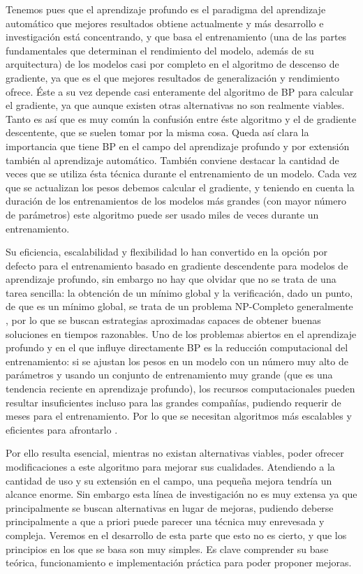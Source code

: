 Tenemos pues que el aprendizaje profundo es el paradigma del aprendizaje automático que mejores resultados obtiene actualmente y más desarrollo e investigación está concentrando, y que basa el entrenamiento (una de las partes fundamentales que determinan el rendimiento del modelo, además de su arquitectura) de los modelos casi por completo en el algoritmo de descenso de gradiente, ya que es el que mejores resultados de generalización y rendimiento ofrece. Éste a su vez depende casi enteramente del algoritmo de BP para calcular el gradiente, ya que aunque existen otras alternativas no son realmente viables. Tanto es así que es muy común la confusión entre éste algoritmo y el de gradiente descentente, que se suelen tomar por la misma cosa. Queda así clara la importancia que tiene BP en el campo del aprendizaje profundo y por extensión también al aprendizaje automático. También conviene destacar la cantidad de veces que se utiliza ésta técnica durante el entrenamiento de un modelo. Cada vez que se actualizan los pesos debemos calcular el gradiente, y teniendo en cuenta la duración de los entrenamientos de los modelos más grandes (con mayor número de parámetros) este algoritmo puede ser usado miles de veces durante un entrenamiento.

Su eficiencia, escalabilidad y flexibilidad lo han convertido en la opción por defecto para el entrenamiento basado en gradiente descendente para modelos de aprendizaje profundo, sin embargo no hay que olvidar que no se trata de una tarea sencilla: la obtención de un mínimo global y la verificación, dado un punto, de que es un mínimo global, se trata de un problema NP-Completo generalmente \cite{NPHardProblem}, por lo que se buscan estrategias aproximadas capaces de obtener buenas soluciones en tiempos razonables. Uno de los problemas abiertos en el aprendizaje profundo y en el que influye directamente BP es la reducción computacional del entrenamiento: si se ajustan los pesos en un modelo con un número muy alto de parámetros y usando un conjunto de entrenamiento muy grande (que es una tendencia reciente en aprendizaje profundo), los recursos computacionales pueden resultar insuficientes incluso para las grandes compañías, pudiendo requerir de meses para el  entrenamiento. Por lo que se necesitan algoritmos más escalables y eficientes para afrontarlo \cite{Problem3_accel}.

Por ello resulta esencial, mientras no existan alternativas viables, poder ofrecer modificaciones a este algoritmo para mejorar sus cualidades. Atendiendo a la cantidad de uso y su extensión en el campo, una pequeña mejora tendría un alcance enorme. Sin embargo esta línea de investigación no es muy extensa ya que principalmente se buscan alternativas en lugar de mejoras, pudiendo deberse principalmente a que a priori puede parecer una técnica muy enrevesada y compleja. Veremos en el desarrollo de esta parte que esto no es cierto, y que los principios en los que se basa son muy simples. Es clave comprender su base teórica, funcionamiento e implementación práctica para poder proponer mejoras. 


